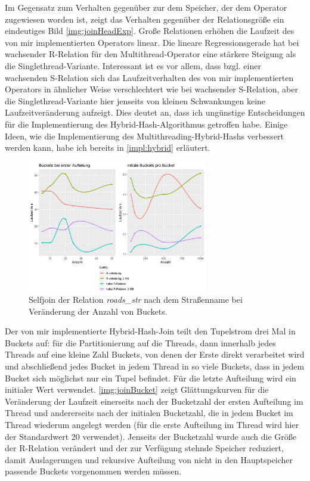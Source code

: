 \documentclass[a4paper,12pt,twoside]{article}
\newcommand{\Fb}[1]{\textit{#1}} %
\begin{document}
{Im Gegensatz zum Verhalten gegenüber zur dem Speicher, der dem Operator zugewiesen worden ist, zeigt das Verhalten gegenüber der Relationsgröße ein eindeutiges Bild \autoref{img:joinHeadExp}. Große Relationen erhöhen die Laufzeit des von mir implementierten Operators linear. Die lineare Regressionsgerade hat bei wachsender R-Relation für den Multithread-Operator eine stärkere Steigung als die Singlethread-Variante. Interessant ist es vor allem, dass bzgl. einer wachsenden S-Relation sich das Laufzeitverhalten des von mir implementierten Operators in ähnlicher Weise verschlechtert wie bei wachsender S-Relation, aber die Singlethread-Variante hier jenseits von kleinen Schwankungen keine Laufzeitveränderung aufzeigt. Dies deutet an, dass ich ungünstige Entscheidungen für die Implementierung des Hybrid-Hash-Algorithmus getroffen habe. Einige Ideen, wie die Implementierung des Multithreading-Hybrid-Hashs verbessert werden kann, habe ich bereits in \autoref{impl:hybrid} erläutert.   

\begin{figure}
	\centering
	\includegraphics[width=0.70\textwidth]{Bilder/join_bucket.png}
	\caption{Selfjoin der Relation \Fb{roads\_str} nach dem Straßenname bei Veränderung der Anzahl von Buckets.}
	\label{img:joinBucket}
\end{figure}

Der von mir implementierte Hybrid-Hash-Join teilt den Tupelstrom drei Mal in Buckets auf: für die Partitionierung auf die Threads, dann innerhalb jedes Threads auf eine kleine Zahl Buckets, von denen der Erste direkt verarbeitet wird und abschließend jedes Bucket in jedem Thread in so viele Buckets, dass in jedem Bucket sich möglichst nur ein Tupel befindet. Für die letzte Aufteilung wird ein initialer Wert verwendet. \autoref{img:joinBucket} zeigt Glättungskurven für die Veränderung der Laufzeit einerseits nach der Bucketzahl der ersten Aufteilung im Thread und andererseits nach der initialen Bucketzahl, die in jedem Bucket im Thread wiederum angelegt werden (für die erste Aufteilung im Thread wird hier der Standardwert 20 verwendet). Jenseits der Bucketzahl wurde auch die Größe der R-Relation verändert und der zur Verfügung stehnde Speicher reduziert, damit Auslagerungen und rekursive Aufteilung von nicht in den Hauptspeicher passende Buckets vorgenommen werden müssen.

}
\end{document}
